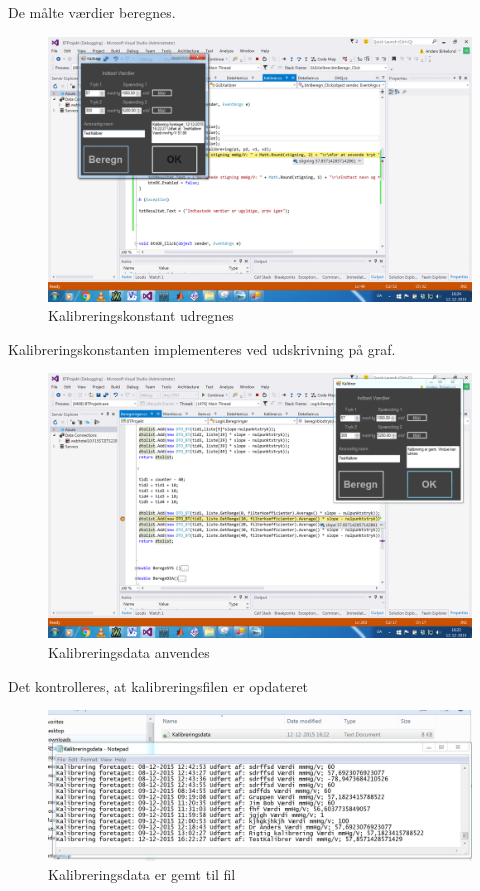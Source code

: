 De målte værdier beregnes.

\begin{figure}[H]
	\centering
	\includegraphics[width=1\textwidth]{Figurer/Test_Kalibrer_2}
	\caption{Kalibreringskonstant udregnes}
\end{figure}

Kalibreringskonstanten implementeres ved udskrivning på graf.
\begin{figure}[H]
	\centering
	\includegraphics[width=1\textwidth]{Figurer/Test_Kalibrer_3}
	\caption{Kalibreringsdata anvendes}
\end{figure}
Det kontrolleres, at kalibreringsfilen er opdateret
\begin{figure}[H]
	\centering
	\includegraphics[width=1\textwidth]{Figurer/Test_Kalibrer_4}
	\caption{Kalibreringsdata er gemt til fil}
\end{figure}

